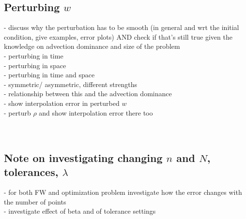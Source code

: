 \documentclass[11pt, a4paper]{article}
\theoremstyle{definition}
\begin{document}
\subsection{Perturbing $w$}
- discuss why the perturbation has to be smooth (in general and wrt the initial condition, give examples, error plots) AND check if that's still true given the knowledge on advection dominance and size of the problem\\
- perturbing in time \\
- perturbing in space \\
- perturbing in time and space \\
- symmetric/ asymmetric, different strengths\\
- relationship between this and the advection dominance\\
- show interpolation error in perturbed $w$\\
- perturb $\rho$ and show interpolation error there too\\
\\
\\

\subsection{Note on investigating changing $n$ and $N$, tolerances, $\lambda$}
- for both FW and optimization problem investigate how the error changes with the number of points\\
- investigate effect of beta and of tolerance settings\\
\end{document}
